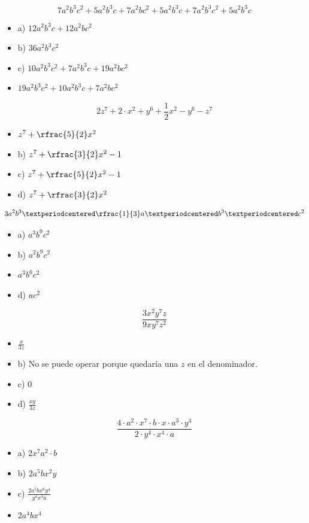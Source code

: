 \[
	7a^2b^3c^2 + 5a^2b^3c  + 7a^2bc^2 + 5a^2b^3c + 7a^2b^3c^2 + 5a^2b^3c 
\]

\begin{itemize}
	\item a) $12a^2b^3c + 12a^2bc^2$
	\item b) $36a^2b^3c^2$
	\item c) $10a^2b^3c^2 + 7a^2b^3c + 19a^2bc^2$
	\item {} $19a^2b^3c^2 + 10a^2b^3c + 7a^2bc^2$
\end{itemize}

\[
	2z^7 + 2·x^2 + y^6 + \frac{1}{2}x^2 - y^6 -z^7
\]

\begin{itemize}
	\item {} $z^7 + \rfrac{5}{2}x^2$
	\item b) $z^7 + \rfrac{3}{2}x^2 - 1$
	\item c) $z^7 + \rfrac{5}{2}x^2 - 1$
	\item d) $z^7 + \rfrac{3}{2}x^2$
\end{itemize}


\[
	3a^2b^3 · \rfrac{1}{3}a·b^3·c^2
\]

\begin{itemize}
	\item a) $a^3b^9c^2$
	\item b) $a^2b^9c^2$
	\item {} $a^3b^6c^2$
	\item d) $ac^2$
\end{itemize}


\[
	\frac{3x^2y^7z}{9xy^7z^2}
\]

\begin{itemize}
	\item {} $\frac{x}{3z}$
	\item b) No se puede operar porque quedaría una $z$ en el denominador.
	\item c) $0$
	\item d) $\frac{xy}{3z}$
\end{itemize}


\[
	\frac{4·a^2·x^7·b·x·a^3·y^4}{2·y^4·x^4·a}
\]

\begin{itemize}
	\item a) $2x^7a^2·b$
	\item b) $2a^5bx^2y$
	\item c) $\frac{2a^5bx^8y^4}{y^4x^4a}$
	\item {} $2a^4bx^4$
\end{itemize}


